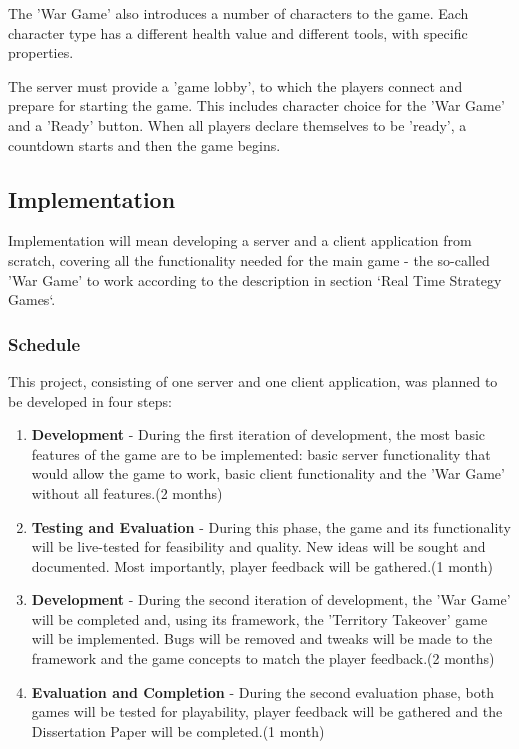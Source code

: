 \documentclass{article}
\begin{document}
The 'War Game' also introduces a number of characters to the game. Each
character type has a different health value and different tools, with specific
properties.\newline

The server must provide a 'game lobby', to which the players connect and prepare
for starting the game. This includes character choice for the 'War Game' and a
'Ready' button. When all players declare themselves to be 'ready', a countdown
starts and then the game begins.\newline

\subsection{Implementation}

Implementation will mean developing a server and a client application from
scratch, covering all the functionality needed for the main game - the so-called
'War Game' to work according to the description in section `Real Time Strategy
Games`.

\subsubsection{Schedule}
This project, consisting of one server and one client application, was planned
to be developed in four steps:
\begin{enumerate}
  \item \textbf{Development} - During the first iteration of development, the
  most basic features of the game are to be implemented: basic server
  functionality that would allow the game to work, basic client functionality
  and the 'War Game' without all features.(2 months)
  \item \textbf{Testing and Evaluation} - During this phase, the game and its
  functionality will be live-tested for feasibility and quality. New ideas will
  be sought and documented. Most importantly, player feedback will be
  gathered.(1 month)
  \item \textbf{Development} - During the second iteration of development, the
  'War Game' will be completed and, using its framework, the 'Territory
  Takeover' game will be implemented. Bugs will be removed and tweaks will be
  made to the framework and the game concepts to match the player feedback.(2
  months)
  \item \textbf{Evaluation and Completion} -  During the second evaluation
  phase, both games will be tested for playability, player feedback will be
  gathered and the Dissertation Paper will be completed.(1 month)
\end{enumerate}
\end{document}
